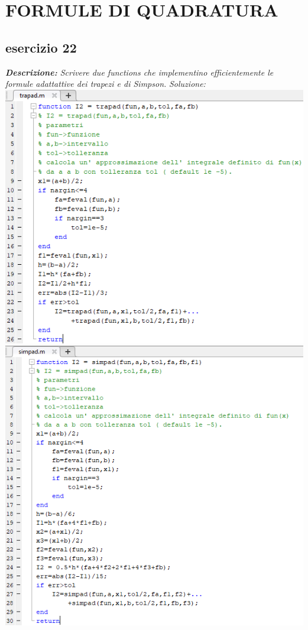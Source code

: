 \chapter{FORMULE DI QUADRATURA}
\section{esercizio 22}
\textit{\textbf{Descrizione:}  Scrivere due functions che implementino efficientemente le formule adattattive dei trapezi e di Simpson.}\newline
\noindent\emph{Soluzione: }\newline
\includegraphics[width=1.3\linewidth]{img/trapad.png}\newpage
\includegraphics[width=1.3\linewidth]{img/simpad.png}\newpage